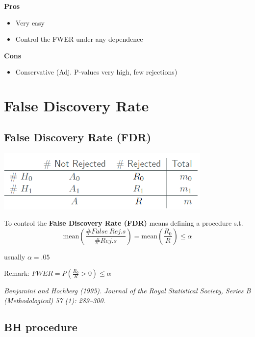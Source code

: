 \documentclass[]{article}
\providecommand{\tightlist}{%
  \setlength{\itemsep}{0pt}\setlength{\parskip}{0pt}}
\begin{document}
\textbf{Pros}

\begin{itemize}
\tightlist
\item
  Very easy
\item
  Control the FWER under any dependence
\end{itemize}

\textbf{Cons}

\begin{itemize}
\tightlist
\item
  Conservative (Adj. P-values very high, few rejections)
\end{itemize}

\section{False Discovery Rate}\label{false-discovery-rate}

\subsection{False Discovery Rate (FDR)}\label{false-discovery-rate-fdr}

\begin{center}\includegraphics[width=400]{./figs/confusion} \end{center}

To control the \textbf{False Discovery Rate (FDR)} means defining a
procedure s.t.
\[ \textrm{mean}( \frac{\#  False\ Rej.s}{\# Rej.s} ) = \textrm{mean}({\frac{R_0}{R}} ) \leq \alpha\]

usually \(\alpha=.05\)

Remark: \(FWER= P({\frac{R_0}{R}}>0 ) \leq \alpha\)

\emph{Benjamini and Hochberg (1995). Journal of the Royal Statistical
Society, Series B (Methodological) 57 (1): 289--300.}

\subsection{BH procedure}\label{bh-procedure}
\end{document}
